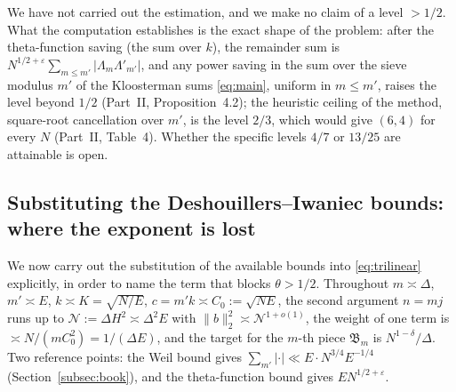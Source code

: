 \documentclass[11pt]{amsart}
\theoremstyle{remark}
\newcommand{\e}{\varepsilon}
\begin{document}
We have not carried out the estimation, and we make no claim of a level $>1/2$. What the computation establishes is the exact shape of the problem: after the theta-function saving (the sum over $k$), the remainder sum is $N^{1/2+\e}\sum_{m\le m'}|\Lambda_m\Lambda'_{m'}|$, and any power saving in the sum over the sieve modulus $m'$ of the Kloosterman sums \eqref{eq:main}, uniform in $m\le m'$, raises the level beyond $1/2$ (Part~II, Proposition~4.2); the heuristic ceiling of the method, square-root cancellation over $m'$, is the level $2/3$, which would give $(6,4)$ for every $N$ (Part~II, Table~4). Whether the specific levels $4/7$ or $13/25$ are attainable is open.

\subsection{Substituting the Deshouillers--Iwaniec bounds: where the exponent is lost}\label{subsec:subst}
We now carry out the substitution of the available bounds into \eqref{eq:trilinear} explicitly, in order to name the term that blocks $\theta>1/2$. Throughout $m\asymp\Delta$, $m'\asymp E$, $k\asymp K=\sqrt{N/E}$, $c=m'k\asymp C_0:=\sqrt{NE}$, the second argument $n=mj$ runs up to $\mathcal N:=\Delta H^2\asymp\Delta^2E$ with $\|b\|_2^2\asymp\mathcal N^{1+o(1)}$, the weight of one term is $\asymp N/(mC_0^2)=1/(\Delta E)$, and the target for the $m$-th piece $\mathfrak B_m$ is $N^{1-\delta}/\Delta$. Two reference points: the Weil bound gives $\sum_{m'}|\cdot|\ll E\cdot N^{3/4}E^{-1/4}$ (Section~\ref{subsec:book}), and the theta-function bound gives $EN^{1/2+\e}$.
\end{document}
